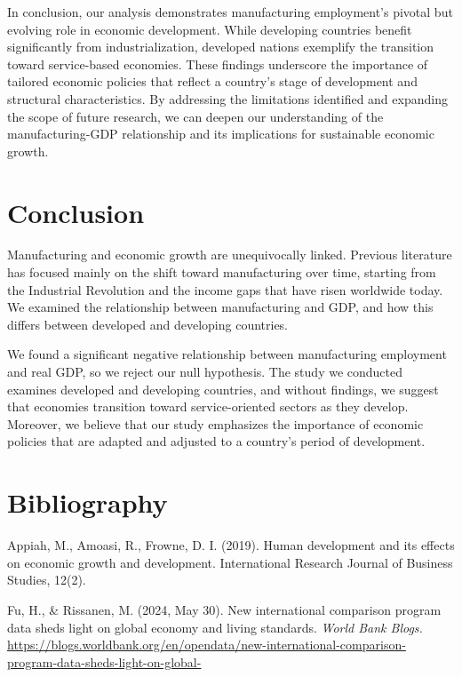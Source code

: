 \documentclass[12pt]{article}
\begin{document}
    In conclusion, our analysis demonstrates manufacturing employment's pivotal but evolving role in economic development. While developing countries benefit significantly from industrialization, developed nations exemplify the transition toward service-based economies. These findings underscore the importance of tailored economic policies that reflect a country's stage of development and structural characteristics. By addressing the limitations identified and expanding the scope of future research, we can deepen our understanding of the manufacturing-GDP relationship and its implications for sustainable economic growth.


\section{Conclusion}
\label{sec:conclusion}

Manufacturing and economic growth are unequivocally linked. Previous literature has focused mainly on the shift toward manufacturing over time, starting from the Industrial Revolution and the income gaps that have risen worldwide today.  We examined the relationship between manufacturing and GDP, and how this differs between developed and developing countries.

We found a significant negative relationship between manufacturing employment and real GDP, so we reject our null hypothesis. The study we conducted examines developed and developing countries, and without findings, we suggest that economies transition toward service-oriented sectors as they develop. Moreover, we believe that our study emphasizes the importance of economic policies that are adapted and adjusted to a country's period of development. 

\newpage
\section*{Bibliography}
\singlespacing
\setlength\bibsep{0pt}

Appiah, M., Amoasi, R., Frowne, D. I. (2019). Human development and its effects on economic growth and development. International Research Journal of Business Studies, 12(2).

Fu, H., \& Rissanen, M. (2024, May 30). New international comparison program data sheds light on global economy and living standards. \textit{World Bank Blogs.} \href{https://blogs.worldbank.org/en/opendata/new-international-comparison-program-data-sheds-light-on-global-}{https://blogs.worldbank.org/en/opendata/new-international-comparison-program-data-sheds-light-on-global-}
\end{document}
